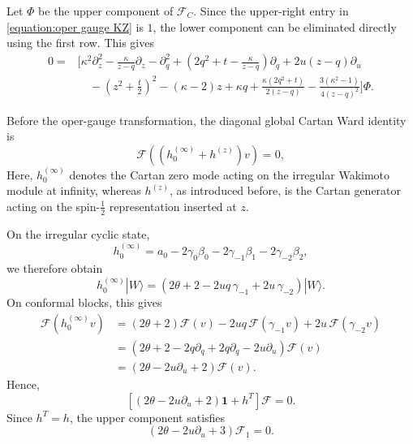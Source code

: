 \documentclass[a4paper,11pt]{article}
\newcommand{\cF}{\mathcal{F}}
\numberwithin{equation}{section}
\begin{document}
Let $\Phi$ be the upper component of $\cF_{C}$.  Since the upper-right entry in
\eqref{equation:oper gauge KZ} is $1$, the lower component can be
eliminated directly using the first row.  This gives
\begin{equation}
	\label{equation:exact scalar KZ}
	\begin{aligned}
		0={}&
		\Bigg[
		\kappa^{2}\partial_{z}^{2}
		-
		\frac{\kappa}{z-q}\partial_{z}
		-
		\partial_{q}^{2}
		+
		\left(
		2q^{2}+t-\frac{\kappa}{z-q}
		\right)\partial_{q}
		+
		2u(z-q)\partial_{u}
		\\
		&\quad
		-
		\left(z^{2}+\frac{t}{2}\right)^{2}
		-
		(\kappa-2)z
		+
		\kappa q
		+
		\frac{\kappa(2q^{2}+t)}{2(z-q)}
		-
		\frac{3(\kappa^{2}-1)}{4(z-q)^{2}}
		\Bigg]\Phi .
	\end{aligned}
\end{equation}


Before the oper-gauge transformation, the diagonal global Cartan Ward identity is
\begin{equation}
	\cF\left(
	\left(
	h_{0}^{(\infty)}+h^{(z)}
	\right)v
	\right)
	=
	0,
\end{equation}
Here, $h_0^{(\infty)}$ denotes the Cartan zero mode acting on the irregular Wakimoto module at infinity, whereas $h^{(z)}$, as introduced before, is the Cartan generator acting on the spin-$\frac12$ representation inserted at $z$.

On the irregular cyclic state,
\begin{equation}
	h_{0}^{(\infty)}
	=
	a_{0}
	-
	2\gamma_{0}\beta_{0}
	-
	2\gamma_{-1}\beta_{1}
	-
	2\gamma_{-2}\beta_{2},
\end{equation}
we therefore obtain
\begin{equation}
	h_{0}^{(\infty)}|W\rangle
	=
	\left(
	2\theta+2
	-2uq\,\gamma_{-1}
	+2u\,\gamma_{-2}
	\right)|W\rangle.
\end{equation}
On conformal blocks, this gives
\begin{equation}
	\begin{aligned}
		\cF\left(h_{0}^{(\infty)}v\right)
		&=
		\left(2\theta+2\right)\cF(v)
		-
		2uq\,\cF(\gamma_{-1}v)
		+
		2u\,\cF(\gamma_{-2}v)
		\\
		&=
		\left(
		2\theta+2
		-2q\partial_{q}
		+2q\partial_{q}
		-2u\partial_{u}
		\right)\cF(v)
		\\
		&=
		\left(
		2\theta-2u\partial_{u}+2
		\right)\cF(v).
	\end{aligned}
\end{equation}
Hence, 
\begin{equation}
	\left[
	\left(
	2\theta-2u\partial_{u}+2
	\right)\mathbf{1}
	+
	h^{T}
	\right]\cF
	=
	0.
\end{equation}
Since $h^{T}=h$, the upper component satisfies
\begin{equation}
	\left(
	2\theta-2u\partial_{u}+3
	\right)\cF_{1}
	=
	0.
\end{equation}
\end{document}
